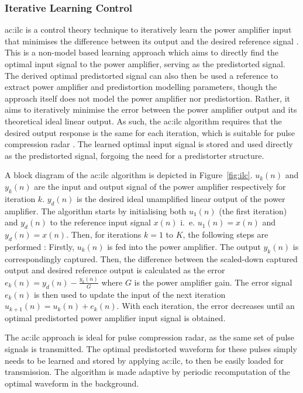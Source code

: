 \subsubsection{Iterative Learning Control}\label{sec:iterative_learning_control}

\gls{ac:ilc} is a control theory technique to iteratively learn the power amplifier input that minimises the difference between its output and the desired reference signal \cite{chanicahuana}. This is a non-model based learning approach which aims to directly find the optimal input signal to the power amplifier, serving as the predistorted signal. The derived optimal predistorted signal can also then be used a reference to extract power amplifier and predistortion modelling parameters, though the approach itself does not model the power amplifier nor predistortion. Rather, it aims to iteratively minimise the error between the power amplifier output and its theoretical ideal linear output. As such, the \gls{ac:ilc} algorithm requires that the desired output response is the same for each iteration, which is suitable for pulse compression radar \cite{hanning}. The learned optimal input signal is stored and used directly as the predistorted signal, forgoing the need for a predistorter structure. 

A block diagram of the \gls{ac:ilc} algorithm is depicted in Figure~\ref{fig:ilc}. $u_k(n)$ and $y_k(n)$ are the input and output signal of the power amplifier respectively for iteration $k$. $y_d(n)$ is the desired ideal unamplified linear output of the power amplifier. The algorithm starts by initialising both $u_1(n)$ (the first iteration) and $y_d(n)$ to the reference input signal $x(n)$ i.~e. $u_1(n) = x(n)$ and $y_d(n) = x(n)$. Then, for iterations $k = 1$ to $K$, the following steps are performed \cite{chanicahuana}: Firstly, $u_k(n)$ is fed into the power amplifier. The output $y_k(n)$ is correspondingly captured. Then, the difference between the scaled-down captured output and desired reference output is calculated as the error $e_k(n) = y_d(n) - \frac{y_k(n)}{G}$ where $G$ is the power amplifier gain. The error signal $e_k(n)$ is then used to update the input of the next iteration $u_{k+1}(n) = u_k(n) + e_k(n)$. With each iteration, the error decreases until an optimal predistorted power amplifier input signal is obtained. 

The \gls{ac:ilc} approach is ideal for pulse compression radar, as the same set of pulse signals is transmitted. The optimal predistorted waveform for these pulses simply needs to be learned and stored by applying \gls{ac:ilc}, to then be easily loaded for transmission. The algorithm is made adaptive by periodic recomputation of the optimal waveform in the background.



